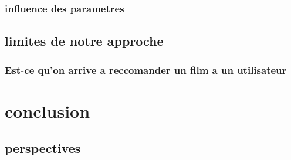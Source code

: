 \documentclass[a4paper,10pt]{article}
\begin{document}
\subsubsection{influence des parametres}
\subsection{limites de notre approche}
\subsubsection{Est-ce qu'on arrive a reccomander un film a un utilisateur}
\section{conclusion}

\subsection{perspectives}
\end{document}
